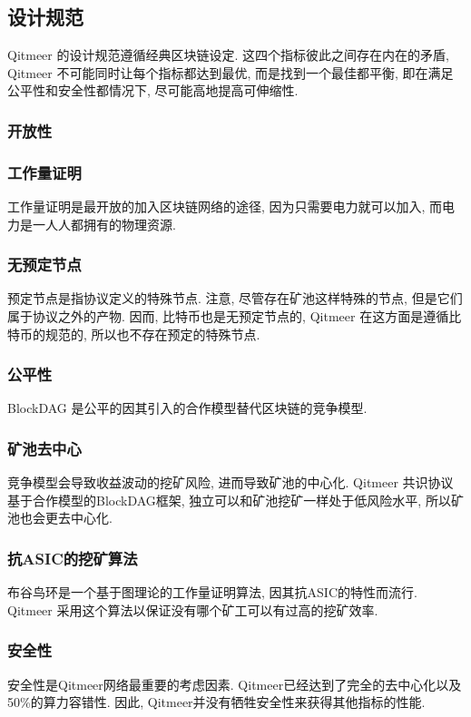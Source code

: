 \documentclass[a4paper,11pt]{article}
\begin{document}
\subsection{设计规范}
Qitmeer 的设计规范遵循经典区块链设定. 这四个指标彼此之间存在内在的矛盾, Qitmeer 不可能同时让每个指标都达到最优, 而是找到一个最佳都平衡, 即在满足公平性和安全性都情况下, 尽可能高地提高可伸缩性.

\subsubsection{开放性}

\subsubsection*{工作量证明}
工作量证明是最开放的加入区块链网络的途径, 因为只需要电力就可以加入, 而电力是一人人都拥有的物理资源. 
\subsubsection*{无预定节点}
预定节点是指协议定义的特殊节点. 注意, 尽管存在矿池这样特殊的节点, 但是它们属于协议之外的产物. 因而, 比特币也是无预定节点的, Qitmeer 在这方面是遵循比特币的规范的, 所以也不存在预定的特殊节点.
\subsubsection{公平性}
BlockDAG 是公平的因其引入的合作模型替代区块链的竞争模型.

\subsubsection*{矿池去中心}
竞争模型会导致收益波动的挖矿风险, 进而导致矿池的中心化. Qitmeer 共识协议基于合作模型的BlockDAG框架, 独立可以和矿池挖矿一样处于低风险水平, 所以矿池也会更去中心化.

\subsubsection*{抗ASIC的挖矿算法}
布谷鸟环是一个基于图理论的工作量证明算法, 因其抗ASIC的特性而流行. Qitmeer 采用这个算法以保证没有哪个矿工可以有过高的挖矿效率.
\subsubsection{安全性}
安全性是Qitmeer网络最重要的考虑因素. Qitmeer已经达到了完全的去中心化以及50\%的算力容错性. 因此, Qitmeer并没有牺牲安全性来获得其他指标的性能.
\end{document}
